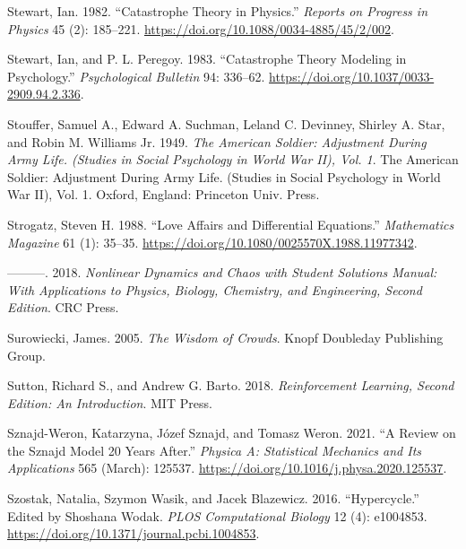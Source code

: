 \documentclass[
  a4paper,
  DIV=11,
  numbers=noendperiod,
  oneside]{scrreprt}
\newlength{\cslhangindent}
\newenvironment{CSLReferences}[2] %
 {\begin{list}{}{%
  \setlength{\itemindent}{0pt}
  \setlength{\leftmargin}{0pt}
  \setlength{\parsep}{0pt}
  \ifodd #1
   \setlength{\leftmargin}{\cslhangindent}
   \setlength{\itemindent}{-1\cslhangindent}
  \fi
  \setlength{\itemsep}{#2\baselineskip}}}
 {\end{list}}
\begin{document}
\begin{CSLReferences}{1}{0}
Stewart, Ian. 1982. {``Catastrophe Theory in Physics.''} \emph{Reports
on Progress in Physics} 45 (2): 185--221.
\url{https://doi.org/10.1088/0034-4885/45/2/002}.

Stewart, Ian, and P. L. Peregoy. 1983. {``Catastrophe Theory Modeling in
Psychology.''} \emph{Psychological Bulletin} 94: 336--62.
\url{https://doi.org/10.1037/0033-2909.94.2.336}.

Stouffer, Samuel A., Edward A. Suchman, Leland C. Devinney, Shirley A.
Star, and Robin M. Williams Jr. 1949. \emph{The {American} Soldier:
{Adjustment} During Army Life. ({Studies} in Social Psychology in {World
War II}), {Vol}. 1}. The {American} Soldier: {Adjustment} During Army
Life. ({Studies} in Social Psychology in {World War II}), {Vol}. 1.
{Oxford, England}: {Princeton Univ. Press}.

Strogatz, Steven H. 1988. {``Love {Affairs} and {Differential
Equations}.''} \emph{Mathematics Magazine} 61 (1): 35--35.
\url{https://doi.org/10.1080/0025570X.1988.11977342}.

---------. 2018. \emph{Nonlinear {Dynamics} and {Chaos} with {Student
Solutions Manual}: {With Applications} to {Physics}, {Biology},
{Chemistry}, and {Engineering}, {Second Edition}}. {CRC Press}.

Surowiecki, James. 2005. \emph{The {Wisdom} of {Crowds}}. {Knopf
Doubleday Publishing Group}.

Sutton, Richard S., and Andrew G. Barto. 2018. \emph{Reinforcement
{Learning}, Second Edition: {An Introduction}}. {MIT Press}.

Sznajd-Weron, Katarzyna, Józef Sznajd, and Tomasz Weron. 2021. {``A
Review on the {Sznajd} Model \textemdash{} 20 Years After.''}
\emph{Physica A: Statistical Mechanics and Its Applications} 565
(March): 125537. \url{https://doi.org/10.1016/j.physa.2020.125537}.

Szostak, Natalia, Szymon Wasik, and Jacek Blazewicz. 2016.
{``Hypercycle.''} Edited by Shoshana Wodak. \emph{PLOS Computational
Biology} 12 (4): e1004853.
\url{https://doi.org/10.1371/journal.pcbi.1004853}.


\end{CSLReferences}
\end{document}
